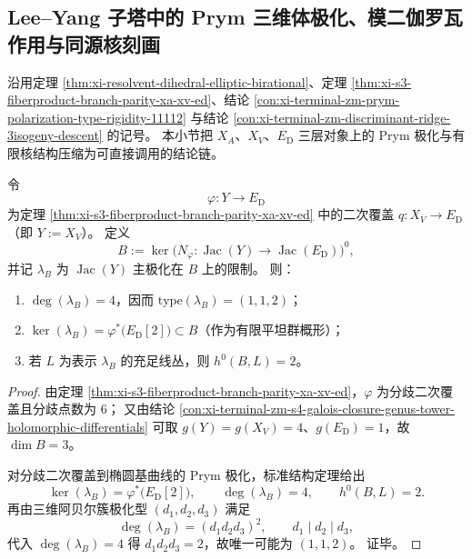 \subsection{Lee--Yang 子塔中的 Prym 三维体极化、模二伽罗瓦作用与同源核刻画}\label{subsec:conclusion-leyang-prym-polarization-galois-kernel-isogeny}
沿用定理 \ref{thm:xi-resolvent-dihedral-elliptic-birational}、定理 \ref{thm:xi-s3-fiberproduct-branch-parity-xa-xv-ed}、结论 \ref{con:xi-terminal-zm-prym-polarization-type-rigidity-11112} 与结论 \ref{con:xi-terminal-zm-discriminant-ridge-3isogeny-descent} 的记号。
本小节把 \(X_A\)、\(X_V\)、\(E_{\mathrm D}\) 三层对象上的 Prym 极化与有限核结构压缩为可直接调用的结论链。

\begin{theorem}\label{thm:conclusion-leyang-prym3-polarization-kernel-h0}
令
\[
\varphi:Y\to E_{\mathrm D}
\]
为定理 \ref{thm:xi-s3-fiberproduct-branch-parity-xa-xv-ed} 中的二次覆盖 \(q:X_V\to E_{\mathrm D}\)（即 \(Y:=X_V\)）。
定义
\[
B:=\ker\!\bigl(N_{\varphi}: \operatorname{Jac}(Y)\to \operatorname{Jac}(E_{\mathrm D})\bigr)^0,
\]
并记 \(\lambda_B\) 为 \(\operatorname{Jac}(Y)\) 主极化在 \(B\) 上的限制。
则：
\begin{enumerate}
  \item \(\deg(\lambda_B)=4\)，因而 \(\mathrm{type}(\lambda_B)=(1,1,2)\)；
  \item \(\ker(\lambda_B)=\varphi^*\!\bigl(E_{\mathrm D}[2]\bigr)\subset B\)（作为有限平坦群概形）；
  \item 若 \(L\) 为表示 \(\lambda_B\) 的充足线丛，则 \(h^0(B,L)=2\)。
\end{enumerate}
\end{theorem}
\begin{proof}
由定理 \ref{thm:xi-s3-fiberproduct-branch-parity-xa-xv-ed}，\(\varphi\) 为分歧二次覆盖且分歧点数为 \(6\)；
又由结论 \ref{con:xi-terminal-zm-s4-galois-closure-genus-tower-holomorphic-differentials} 可取 \(g(Y)=g(X_V)=4\)、\(g(E_{\mathrm D})=1\)，故 \(\dim B=3\)。

对分歧二次覆盖到椭圆基曲线的 Prym 极化，标准结构定理给出
\[
\ker(\lambda_B)=\varphi^*\!\bigl(E_{\mathrm D}[2]\bigr),\qquad
\deg(\lambda_B)=4,\qquad
h^0(B,L)=2.
\]
再由三维阿贝尔簇极化型 \((d_1,d_2,d_3)\) 满足
\[
\deg(\lambda_B)=(d_1d_2d_3)^2,\qquad d_1\mid d_2\mid d_3,
\]
代入 \(\deg(\lambda_B)=4\) 得 \(d_1d_2d_3=2\)，故唯一可能为 \((1,1,2)\)。
证毕。
\end{proof}

